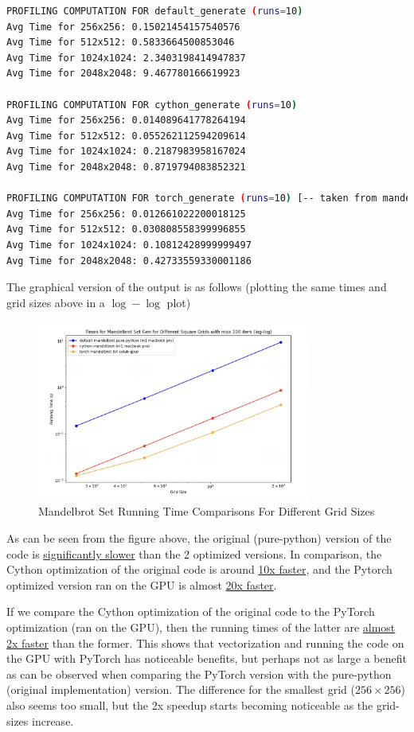 \documentclass[a4paper,12pt]{article}
\begin{document}
\begin{lstlisting}[language=bash,basicstyle=\tiny\ttfamily]
PROFILING COMPUTATION FOR default_generate (runs=10)
Avg Time for 256x256: 0.15021454157540576
Avg Time for 512x512: 0.5833664500853046
Avg Time for 1024x1024: 2.3403198414947837
Avg Time for 2048x2048: 9.467780166619923

PROFILING COMPUTATION FOR cython_generate (runs=10)
Avg Time for 256x256: 0.014089641778264194
Avg Time for 512x512: 0.055262112594209614
Avg Time for 1024x1024: 0.2187983958167024
Avg Time for 2048x2048: 0.8719794083852321

PROFILING COMPUTATION FOR torch_generate (runs=10) [-- taken from mandelbrot_torch.ipynb notebook]
Avg Time for 256x256: 0.012661022200018125
Avg Time for 512x512: 0.030808558399996855
Avg Time for 1024x1024: 0.10812428999999497
Avg Time for 2048x2048: 0.42733559330001186
\end{lstlisting}

The graphical version of the output is as follows (plotting the same times and grid sizes above in a $\log - \log$ plot)
\begin{figure}[H]
  \centering
  \includegraphics[width=0.8\textwidth]{images/bonus_comparison.png}
  \caption{Mandelbrot Set Running Time Comparisons For Different Grid Sizes}
\end{figure}

As can be seen from the figure above, the original (pure-python) version of the code is \underline{significantly slower} than the 2 optimized versions. In comparison, the Cython optimization of the original code is around \underline{10x faster}, and the Pytorch optimized version ran on the GPU is almost \underline{20x faster}. 

If we compare the Cython optimization of the original code to the PyTorch optimization (ran on the GPU), then the running times of the latter are \underline{almost 2x faster} than the former. This shows that vectorization and running the code on the GPU with PyTorch has noticeable benefits, but perhaps not as large a benefit as can be observed when comparing the PyTorch version with the pure-python (original implementation) version. The difference for the smallest grid ($256 \times 256$) also seems too small, but the 2x speedup starts becoming noticeable as the grid-sizes increase. 
\end{document}
